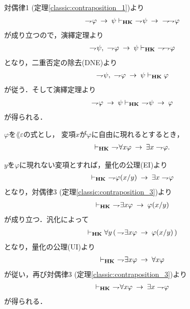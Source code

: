 	\begin{sketch}
		対偶律1 (定理\ref{classic:contraposition_1})より
		\begin{align}
			\negation \varphi \rarrow \psi \provable{\mbox{{\bf HK}}}\ 
			\negation \psi \rarrow\ \negation \negation \varphi
		\end{align}
		が成り立つので，演繹定理より
		\begin{align}
			\rightharpoondown\hspace{-0.25em} \psi,\ \rightharpoondown\hspace{-0.25em} \varphi \hspace{0.25em}\rightarrow\hspace{0.25em} \psi 
			\vdash_{{\scriptsize \mbox{{\bf HK}}}}\ \rightharpoondown\hspace{-0.25em} \rightharpoondown\hspace{-0.25em} \varphi
		\end{align}
		となり，二重否定の除去(DNE)より
		\begin{align}
			\rightharpoondown\hspace{-0.25em} \psi,\ \rightharpoondown\hspace{-0.25em} \varphi \hspace{0.25em}\rightarrow\hspace{0.25em} \psi 
			\vdash_{{\scriptsize \mbox{{\bf HK}}}} \varphi
		\end{align}
		が従う．そして演繹定理より
		\begin{align}
			\rightharpoondown\hspace{-0.25em} \varphi \hspace{0.25em}\rightarrow\hspace{0.25em} \psi 
			\vdash_{{\scriptsize \mbox{{\bf HK}}}}\ \rightharpoondown\hspace{-0.25em} \psi \hspace{0.25em}\rightarrow\hspace{0.25em} \varphi
		\end{align}
		が得られる．
		\QED
	\end{sketch}
	
	\begin{screen}
		\begin{thm}
		\label{classic:strong_De_Morgan_law_for_quantifier_2}
			$\varphi$を$\lang{\varepsilon}$の式とし，
			変項$x$が$\varphi$に自由に現れるとするとき，
			\begin{align}
				\vdash_{{\scriptsize \mbox{{\bf HK}}}}\ \rightharpoondown\hspace{-0.25em} \forall x \varphi \hspace{0.25em}\rightarrow\hspace{0.25em} 
				\exists x \rightharpoondown\hspace{-0.25em} \varphi.
			\end{align}
		\end{thm}
	\end{screen}
	
	\begin{sketch}
		$y$を$\varphi$に現れない変項とすれば，量化の公理(EI)より
		\begin{align}
			\vdash_{{\scriptsize \mbox{{\bf HK}}}}\ \rightharpoondown\hspace{-0.25em} \varphi(x/y) \hspace{0.25em}\rightarrow\hspace{0.25em} \exists x \rightharpoondown\hspace{-0.25em} \varphi
		\end{align}
		となり，対偶律3 (定理\ref{classic:contraposition_3})より
		\begin{align}
			\provable{\mbox{{\bf HK}}}\ 
			\negation \exists x \varphi \rarrow \varphi(x/y)
		\end{align}
		が成り立つ．汎化によって
		\begin{align}
			\vdash_{{\scriptsize \mbox{{\bf HK}}}}
			\forall y\, (\, \rightharpoondown\hspace{-0.25em} \exists x \varphi \hspace{0.25em}\rightarrow\hspace{0.25em} \varphi(x/y)\, )
		\end{align}
		となり，量化の公理(UI)より
		\begin{align}
			\provable{\mbox{{\bf HK}}}\ 
			\negation \exists x \varphi \rarrow \forall x \varphi
		\end{align}
		が従い，再び対偶律3 (定理\ref{classic:contraposition_3})より
		\begin{align}
			\vdash_{{\scriptsize \mbox{{\bf HK}}}}\ \rightharpoondown\hspace{-0.25em} \forall x \varphi \hspace{0.25em}\rightarrow\hspace{0.25em} \exists x \rightharpoondown\hspace{-0.25em} \varphi
		\end{align}
		が得られる．
		\QED
	\end{sketch}
	
